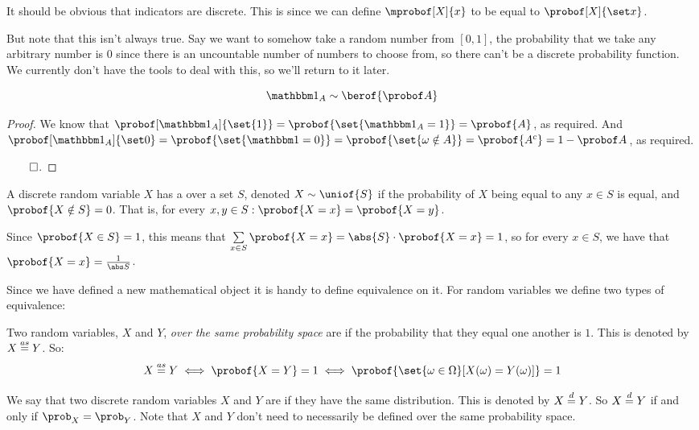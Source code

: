 \begin{note}

	It should be obvious that indicators are discrete.
	This is since we can define $\mprobof[X]{x}$ to be equal to $\probof[X]{\set x}$.

	But note that this isn't always true.
	Say we want to somehow take a random number from $[0,1]$, the probability that we take any arbitrary number is $0$ since
	there is an uncountable number of numbers to choose from, so there can't be a discrete probability function.
	We currently don't have the tools to deal with this, so we'll return to it later.

\end{note}

\begin{prop*}

	\[ \bone_A\sim\berof{\probof A} \]

\end{prop*}

\begin{proof}

	We know that $\probof[\bone_A]{\set{1}} = \probof{\set{\bone_A=1}} = \probof{A}$, as required.
	And $\probof[\bone_A]{\set0} = \probof{\set{\bone=0}} = \probof{\set{\omega\notin A}} = \probof{A^c} = 1-\probof A$,
	as required.

\hfill$\qed$.

\end{proof}

\begin{defn*}

	A discrete random variable $X$ has a  over a set $S$, denoted $X\sim\uniof{S}$ if the
	probability of $X$ being equal to any $x\in S$ is equal, and $\probof{X\notin S}=0$.
	That is, for every $x,y\in S: \probof{X=x}=\probof{X=y}$.

\end{defn*}

Since $\probof{X\in S}=1$, this means that $\sum\limits_{x\in S}\probof{X=x}=\abs{S}\cdot\probof{X=x}=1$, so for every $x\in S$,
we have that $\probof{X=x}=\frac1{\abs S}$.

Since we have defined a new mathematical object it is handy to define equivalence on it.
For random variables we define two types of equivalence:

\begin{defn*}

	Two random variables, $X$ and $Y$, \emph{over the same probability space} are  if the probability
	that they equal one another is $1$.
	This is denoted by $X\mathrel{\overset{as}=} Y$.
	So:
	\[ X\aseq Y\iff \probof{X=Y}=1 \iff \probof{\set{\omega\in\Omega}[X(\omega)=Y(\omega)]} = 1 \]

	We say that two discrete random variables $X$ and $Y$ are  if they have the same distribution.
	This is denoted by $X\mathrel{\overset d=} Y$.
	So $X\mathrel{\overset d=} Y$ if and only if $\prob_X=\prob_Y$.
	Note that $X$ and $Y$ don't need to necessarily be defined over the same probability space.

\end{defn*}

